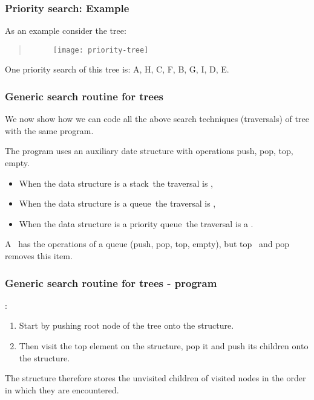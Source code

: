   \begin{frame}[fragile]
\frametitle{Priority search: Example}

As an example consider the tree:

\begin{quote}
\begin{center}
\begin{figure} [ht]
    \centering
    \texttt{[image: priority-tree]}
    \end{figure}
\end{center}
\end{quote}

One priority search of this tree is: A, H, C, F, B, G, I, D, E.
\end{frame}


  \begin{frame}[fragile]
\frametitle{Generic search routine for trees}

We now show how we can code \alert{all} the above search techniques (traversals) of tree \color{blue}with the same program\color{black}.

The program uses an auxiliary date structure with operations \color{blue}push, pop, top, empty\color{black}.

\begin{itemize}
\item When the data structure is a \alert{stack}\ the traversal is \color{blue}{DFS},
\item When the data structure is a \alert{queue}\ the traversal is \color{blue}{BFS},
\item When the data structure is a \alert{priority queue}\ the traversal is a \color{blue}{priority search}.
\end{itemize}

A \color{blue}{priority queue}\ has the operations of a queue (push, pop, top, empty), but top \color{blue}{returns an item of highest priority in the queue}\ and pop removes this item.
\end{frame}

  \begin{frame}[fragile]
\frametitle{Generic search routine for trees - program}

\color{red}{Idea}: 
\begin{enumerate}
\item Start by pushing root node of the tree onto the structure. 
\item Then visit the top element on the structure, pop it and push its children onto the structure.
\end{enumerate}

The structure therefore stores the unvisited children of visited nodes in the order in which they are encountered.
\end{frame}

